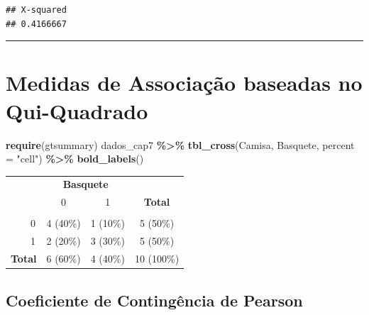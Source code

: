 \documentclass[
]{book}
\newenvironment{Shaded}{\begin{snugshade}}{\end{snugshade}}
\newcommand{\AttributeTok}[1]{\textcolor[rgb]{0.13,0.29,0.53}{#1}}
\newcommand{\FunctionTok}[1]{\textcolor[rgb]{0.13,0.29,0.53}{\textbf{#1}}}
\newcommand{\NormalTok}[1]{#1}
\newcommand{\OtherTok}[1]{\textcolor[rgb]{0.56,0.35,0.01}{#1}}
\newcommand{\SpecialCharTok}[1]{\textcolor[rgb]{0.81,0.36,0.00}{\textbf{#1}}}
\newcommand{\StringTok}[1]{\textcolor[rgb]{0.31,0.60,0.02}{#1}}
\begin{document}
\begin{Shaded}
\end{Shaded}

\begin{verbatim}
## X-squared 
## 0.4166667
\end{verbatim}

\begin{center}\rule{0.5\linewidth}{0.5pt}\end{center}

\section{Medidas de Associação baseadas no Qui-Quadrado}\label{medidas-de-associauxe7uxe3o-baseadas-no-qui-quadrado}

\begin{Shaded}
\begin{Highlighting}[]
\FunctionTok{require}\NormalTok{(gtsummary)}
\NormalTok{dados\_cap7 }\SpecialCharTok{\%\textgreater{}\%} \FunctionTok{tbl\_cross}\NormalTok{(Camisa, Basquete, }\AttributeTok{percent =} \StringTok{"cell"}\NormalTok{) }\SpecialCharTok{\%\textgreater{}\%}
  \FunctionTok{bold\_labels}\NormalTok{()}
\end{Highlighting}
\end{Shaded}

\begin{table}[t]
\fontsize{12.0pt}{14.4pt}\selectfont
\begin{tabular*}{\linewidth}{@{\extracolsep{\fill}}lccc}
\toprule
 & \multicolumn{2}{c}{\textbf{Basquete}} &  \\ 
\cmidrule(lr){2-3}
 & 0 & 1 & \textbf{Total} \\ 
\midrule\addlinespace[2.5pt]
{\bfseries Camisa} &  &  &  \\ 
    0 & 4 (40\%) & 1 (10\%) & 5 (50\%) \\ 
    1 & 2 (20\%) & 3 (30\%) & 5 (50\%) \\ 
{\bfseries Total} & 6 (60\%) & 4 (40\%) & 10 (100\%) \\ 
\bottomrule
\end{tabular*}
\end{table}

\subsection{Coeficiente de Contingência de Pearson}\label{coeficiente-de-continguxeancia-de-pearson}
\end{document}
